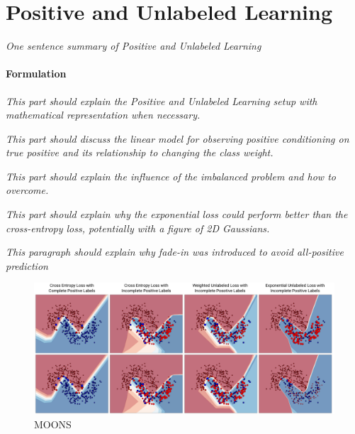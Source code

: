 \section{Positive and Unlabeled Learning}
\label{sec:pulearning}

\textit{One sentence summary of Positive and Unlabeled Learning}


\paragraph{Formulation}

\textit{This part should explain the Positive and Unlabeled Learning setup with mathematical representation when necessary.}


\textit{This part should discuss the linear model for observing positive conditioning on true positive and its relationship to changing the class weight.}


\textit{This part should explain the influence of the imbalanced problem and how to overcome.}


\textit{This part should explain why the exponential loss could perform better than the cross-entropy loss, potentially with a figure of 2D Gaussians.}


\textit{This paragraph should explain why fade-in was introduced to avoid all-positive prediction}




\begin{figure}
\begin{center}
   \includegraphics[width=0.95\linewidth]{img/moons.png}
\end{center}
   \caption{MOONS}
\label{fig:moons}
\end{figure}


